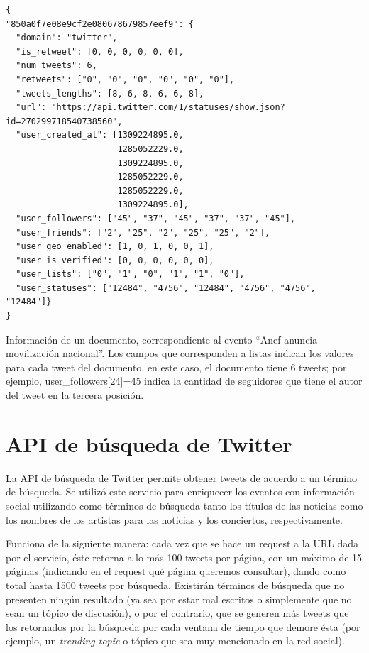 \begin{listing}
\begin{verbatim}
{
"850a0f7e08e9cf2e080678679857eef9": {
  "domain": "twitter",
  "is_retweet": [0, 0, 0, 0, 0, 0],
  "num_tweets": 6,
  "retweets": ["0", "0", "0", "0", "0", "0"],
  "tweets_lengths": [8, 6, 8, 6, 6, 8],
  "url": "https://api.twitter.com/1/statuses/show.json?id=270299718540738560",
  "user_created_at": [1309224895.0,
                      1285052229.0,
                      1309224895.0,
                      1285052229.0,
                      1285052229.0,
                      1309224895.0],
  "user_followers": ["45", "37", "45", "37", "37", "45"],
  "user_friends": ["2", "25", "2", "25", "25", "2"],
  "user_geo_enabled": [1, 0, 1, 0, 0, 1],
  "user_is_verified": [0, 0, 0, 0, 0, 0],
  "user_lists": ["0", "1", "0", "1", "1", "0"],
  "user_statuses": ["12484", "4756", "12484", "4756", "4756", "12484"]}
}
\end{verbatim}
\caption{Información de un documento, correspondiente al evento ``Anef
anuncia movilización nacional''. Los campos que corresponden a listas
indican los valores para cada tweet del documento, en este caso, el
documento tiene 6 tweets; por ejemplo, user\_followers[24]=45 indica
la cantidad de seguidores que tiene el autor del tweet en la tercera
posición.}
\label{fig:doc-example}
\end{listing}






\section{API de búsqueda de Twitter}
\label{sec-4.3}



   La API de búsqueda de Twitter permite obtener tweets de acuerdo a un
   término de búsqueda. Se utilizó este servicio para enriquecer los
   eventos con información social utilizando como términos de búsqueda
   tanto los títulos de las noticias como los nombres de los artistas
   para las noticias y los conciertos, respectivamente.

   Funciona de la siguiente manera: cada vez que se hace un request a la
   URL dada por el servicio, éste retorna a lo más 100 tweets por página, con un
   máximo de 15 páginas (indicando en el request qué página queremos
   consultar), dando como total hasta 1500 tweets por búsqueda. Existirán
   términos de búsqueda que no presenten ningún resultado  (ya sea por
   estar mal escritos o simplemente que no sean un tópico de discusión), o por
   el contrario, que se generen más tweets que los retornados por la
   búsqueda por cada ventana de tiempo que demore ésta (por ejemplo, un
   \emph{trending topic} o tópico que sea muy mencionado en la red social).

